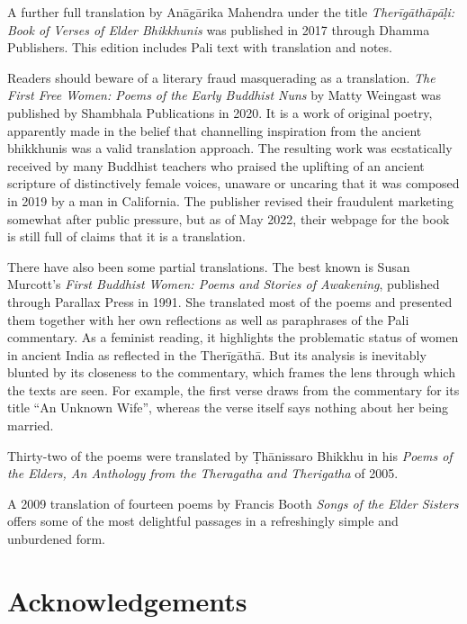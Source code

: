 \documentclass[12pt,openany]{book}%
\begin{document}
A further full translation by \textsanskrit{Anāgārika} Mahendra under the title \textit{\textsanskrit{Therīgāthāpāḷi}: Book of Verses of Elder Bhikkhunis} was published in 2017 through Dhamma Publishers. This edition includes Pali text with translation and notes.

Readers should beware of a literary fraud masquerading as a translation. \textit{The First Free Women: Poems of the Early Buddhist Nuns} by Matty Weingast was published by Shambhala Publications in 2020. It is a work of original poetry, apparently made in the belief that channelling inspiration from the ancient bhikkhunis was a valid translation approach. The resulting work was ecstatically received by many Buddhist teachers who praised the uplifting of an ancient scripture of distinctively female voices, unaware or uncaring that it was composed in 2019 by a man in California. The publisher revised their fraudulent marketing somewhat after public pressure, but as of May 2022, their webpage for the book is still full of claims that it is a translation.

There have also been some partial translations. The best known is Susan Murcott’s \textit{First Buddhist Women: Poems and Stories of Awakening}, published through Parallax Press in 1991. She translated most of the poems and presented them together with her own reflections as well as paraphrases of the Pali commentary. As a feminist reading, it highlights the problematic status of women in ancient India as reflected in the \textsanskrit{Therīgāthā}. But its analysis is inevitably blunted by its closeness to the commentary, which frames the lens through which the texts are seen. For example, the first verse draws from the commentary for its title “An Unknown Wife”, whereas the verse itself says nothing about her being married.

Thirty-two of the poems were translated by \textsanskrit{Ṭhānissaro} Bhikkhu in his \textit{Poems of the Elders, An Anthology from the Theragatha and Therigatha} of 2005.

A 2009 translation of fourteen poems by Francis Booth \textit{Songs of the Elder Sisters} offers some of the most delightful passages in a refreshingly simple and unburdened form.

%
\chapter*{Acknowledgements}
\end{document}
